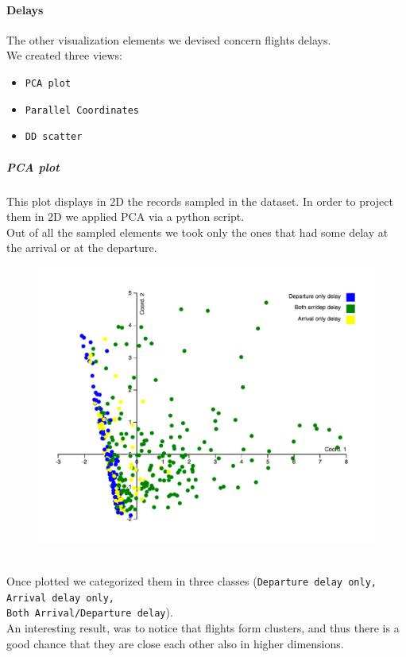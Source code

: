\documentclass[a4paper, 12pt]{article}
\begin{document}
\paragraph*{Delays}
The other visualization elements we devised concern flights delays.\\
We created three views:
\begin{itemize}
\item \texttt{PCA plot}
\item \texttt{Parallel Coordinates}
\item \texttt{DD scatter}
\end{itemize}
\subparagraph{PCA plot} This plot displays in 2D the records sampled in the dataset. In order to project them in 2D we applied PCA via a python script.\\
Out of all the sampled elements we took only the ones that had some delay at the arrival or at the departure.\\
\begin{figure}
\includegraphics[scale=0.7]{pca.PNG}
\end{figure}\\ 
Once plotted we categorized them in three classes (\texttt{Departure delay only, Arrival delay only,\\ Both Arrival/Departure delay}).\\
An interesting result, was to notice that flights form clusters, and thus there is a good chance that they are close each other also in higher dimensions.\\ \\ \\ \\ \\
\end{document}
